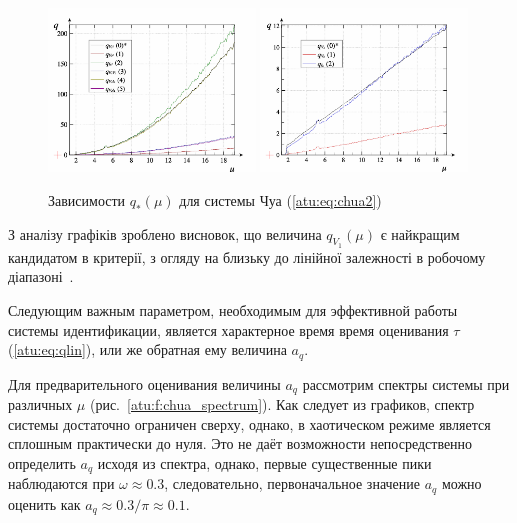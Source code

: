 \begin{figure}[htb!]
\centerline{
  \includegraphics[width=0.49\textwidth]{p/cha/chua/chua_q-p_mu2.png}
  \includegraphics[width=0.49\textwidth]{p/cha/chua/chua_q-p_mu1.png}
}
  \caption{Зависимости $q_{*}(\mu) $ для системы Чуа (\ref{atu:eq:chua2})}
\label{atu:f:chua_q}
\end{figure}

З аналізу графіків зроблено висновок, що величина $q_{V_1}(\mu)$
є найкращим кандидатом в критерії, з огляду на близьку до
лінійної залежності в робочому діапазоні~\cite{atu_apir2011}.

Следующим важным параметром, необходимым для эффективной работы системы идентификации, является
характерное время время оценивания $\tau$ (\ref{atu:eq:qlin}), или же обратная ему величина $a_q$.

Для предварительного оценивания величины $a_q$ рассмотрим спектры системы при различных
$\mu$ (рис.~\ref{atu:f:chua_spectrum}). Как следует из графиков, спектр системы достаточно
ограничен сверху, однако, в хаотическом режиме является сплошным практически до нуля.
Это не даёт возможности непосредственно определить $a_q$ исходя из спектра,
однако, первые существенные пики наблюдаются при $ \omega \approx 0.3 $, следовательно,
первоначальное значение $a_q$ можно оценить как $ a_q \approx 0.3 / \pi \approx 0.1 $.


